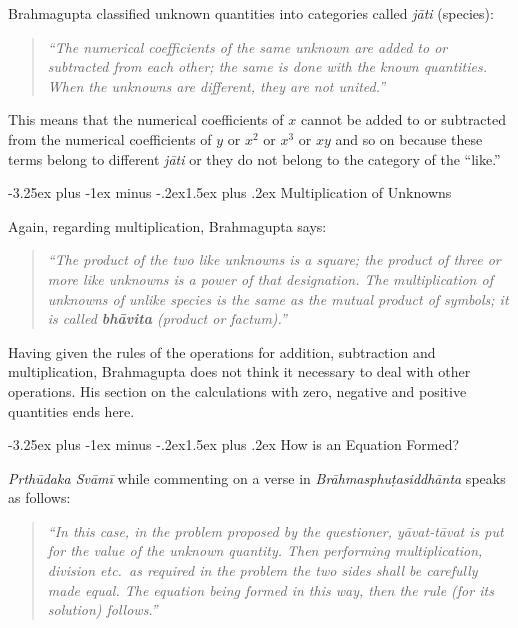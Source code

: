 \documentclass[11pt,a4paper]{article}
\makeatletter
\renewcommand{\subsection}{\@startsection{subsection}{2}{\z@}%
  {-3.25ex plus -1ex minus -.2ex}{1.5ex plus .2ex}%
  {\normalfont\large\bfseries\color{sectioncolor}}}
\makeatother
\begin{document}
Brahmagupta classified unknown quantities into categories called \textit{jāti} (species):

\begin{quote}
\textit{``The numerical coefficients of the same unknown are added to or subtracted from each other; the same is done with the known quantities. When the unknowns are different, they are not united.''}
\end{quote}

This means that the numerical coefficients of $x$ cannot be added to or subtracted from the numerical coefficients of $y$ or $x^2$ or $x^3$ or $xy$ and so on because these terms belong to different \textit{jāti} or they do not belong to the category of the ``like.''

\subsection{Multiplication of Unknowns}

Again, regarding multiplication, Brahmagupta says:

\begin{quote}
\textit{``The product of the two like unknowns is a square; the product of three or more like unknowns is a power of that designation. The multiplication of unknowns of unlike species is the same as the mutual product of symbols; it is called \textbf{bhāvita} (product or factum).''}
\end{quote}

Having given the rules of the operations for addition, subtraction and multiplication, Brahmagupta does not think it necessary to deal with other operations. His section on the calculations with zero, negative and positive quantities ends here.

\subsection{How is an Equation Formed?}

\textit{Prthūdaka Svāmī} while commenting on a verse in \textit{Brāhmasphuṭasiddhānta} speaks as follows:

\begin{quote}
\textit{``In this case, in the problem proposed by the questioner, yāvat-tāvat is put for the value of the unknown quantity. Then performing multiplication, division etc.\ as required in the problem the two sides shall be carefully made equal. The equation being formed in this way, then the rule (for its solution) follows.''}
\end{quote}
\end{document}
